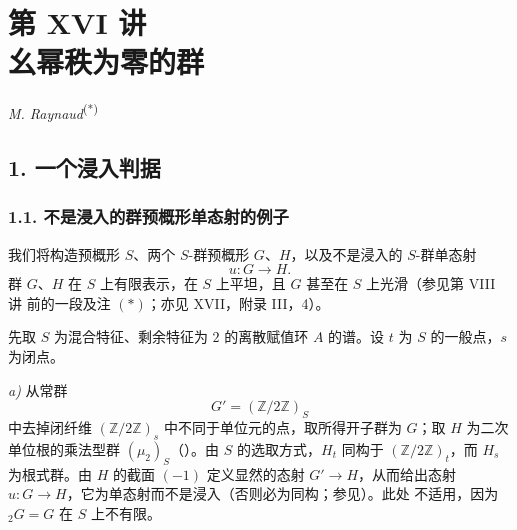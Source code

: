\setcounter{footnote}{0}
\chapter*{第 XVI 讲\\幺幂秩为零的群}

\begin{center}
  \textit{M. Raynaud}\textsuperscript{(*)}
\end{center}
\begingroup
\renewcommand{\thefootnote}{0}
\renewcommand{\thefootnote}{*}
\endgroup

\section*{1. 一个浸入判据}

%
\subsection*{1.1. 不是浸入的群预概形单态射的例子}

我们将构造预概形 \(S\)、两个 \(S\)-群预概形 \(G\)、\(H\)，以及不是浸入的 \(S\)-群单态射
\[
  u:G\longrightarrow H.
\]
群 \(G\)、\(H\) 在 \(S\) 上有限表示，在 \(S\) 上平坦，且 \(G\) 甚至在 \(S\) 上光滑（参见第 VIII 讲  前的一段及注 \((*)\)；亦见 XVII，附录 III，4）。

先取 \(S\) 为混合特征、剩余特征为 \(2\) 的离散赋值环 \(A\) 的谱。设 \(t\) 为 \(S\) 的一般点，\(s\) 为闭点。

\medskip
\noindent\textit{a)} 从常群
\[
  G'=(\mathbb Z/2\mathbb Z)_S
\]
中去掉闭纤维 \((\mathbb Z/2\mathbb Z)_s\) 中不同于单位元的点，取所得开子群为 \(G\)；取 \(H\) 为二次单位根的乘法型群 \((\mu_2)_S\)（）。由 \(S\) 的选取方式，\(H_t\) 同构于 \((\mathbb Z/2\mathbb Z)_t\)，而 \(H_s\) 为根式群。由 \(H\) 的截面 \((-1)\) 定义显然的态射 \(G'\to H\)，从而给出态射 \(u:G\to H\)，它为单态射而不是浸入（否则必为同构；参见）。此处 不适用，因为 \({}_{2}G=G\) 在 \(S\) 上不有限。

